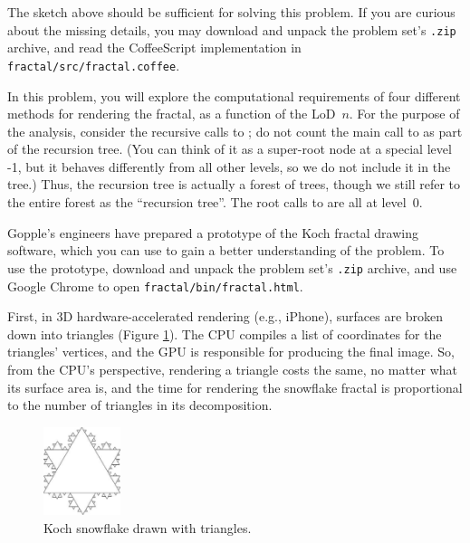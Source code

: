\documentclass[12pt,twoside]{article}
\begin{document}
\begin{problems}
	The sketch above should be sufficient for solving this problem. If you are
	curious about the missing details, you may download and unpack the problem set's
	\texttt{.zip} archive, and read the CoffeeScript implementation in
	\texttt{fractal/src/fractal.coffee}.

	In this problem, you will explore the computational requirements of four
	different methods for rendering the fractal, as a function of the LoD~$n$.
	For the purpose of the analysis, consider the recursive calls to
	; do not count the main call to  as part
	of the recursion tree.
	(You can think of it as a super-root node at a special level -1, but it behaves
	differently from all other levels, so we do not include it in the tree.) Thus,
	the recursion tree is actually a forest of trees, though we still refer to the
	entire forest as the ``recursion tree''. The root calls to 
	are all at level~$0$.

	Gopple's engineers have prepared a prototype of the Koch fractal drawing
	software, which you can use to gain a better understanding of the problem. To
	use the prototype, download and unpack the problem set's \texttt{.zip} archive,
	and use Google Chrome to open \texttt{fractal/bin/fractal.html}.



	First, in 3D hardware-accelerated rendering (e.g., iPhone), surfaces are
	broken down into triangles (Figure \ref{fig:snowflake-triangle}). The CPU
	compiles a list of coordinates for the triangles' vertices, and the GPU
	is responsible for producing the final image. So, from the CPU's
	perspective, rendering a triangle costs the same, no matter what its surface
	area is, and the time for rendering the snowflake fractal is proportional to the
	number of triangles in its decomposition.

	\begin{figure}[htbp]
		\begin{center}
			\includegraphics[width=0.2\textwidth]{figures/snowflake-triangle.pdf}
		\end{center}
		\caption{Koch snowflake drawn with triangles.}
		\label{fig:snowflake-triangle}
	\end{figure}


\end{problems}
\end{document}
